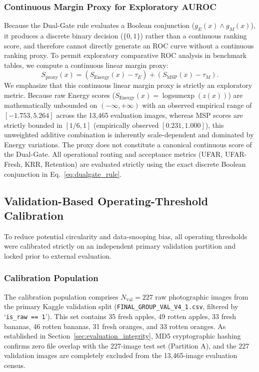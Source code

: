 \subsubsection{Continuous Margin Proxy for Exploratory AUROC}
\label{sec:continuous_proxy}
Because the Dual-Gate rule evaluates a Boolean conjunction ($g_E(x) \land g_M(x)$), it produces a discrete binary decision ($\{0, 1\}$) rather than a continuous ranking score, and therefore cannot directly generate an ROC curve without a continuous ranking proxy. To permit exploratory comparative ROC analysis in benchmark tables, we compute a continuous linear margin proxy:
\begin{equation}
S_{\text{proxy}}(x) = (S_{\text{Energy}}(x) - \tau_E) + (S_{\text{MSP}}(x) - \tau_M).
\end{equation}
We emphasize that this continuous linear margin proxy is strictly an exploratory metric. Because raw Energy scores ($S_{\text{Energy}}(x) = \operatorname{logsumexp}(z(x))$) are mathematically unbounded on $(-\infty, +\infty)$ with an observed empirical range of $[-1.753, 5.264]$ across the 13,465 evaluation images, whereas MSP scores are strictly bounded in $[1/6, 1]$ (empirically observed $[0.231, 1.000]$), this unweighted additive combination is inherently scale-dependent and dominated by Energy variations. The proxy does not constitute a canonical continuous score of the Dual-Gate. All operational routing and acceptance metrics (UFAR, UFAR-Fresh, KRR, Retention) are evaluated strictly using the exact discrete Boolean conjunction in Eq.~\eqref{eq:dualgate_rule}.

\subsection{Validation-Based Operating-Threshold Calibration}
\label{sec:threshold_calibration}

To reduce potential circularity and data-snooping bias, all operating thresholds were calibrated strictly on an independent primary validation partition and locked prior to external evaluation.

\subsubsection{Calibration Population}
The calibration population comprises $N_{\text{val}} = 227$ raw photographic images from the primary Kaggle validation split ({\small\nolinkurl{FINAL_GROUP_VAL_V4_1.csv}}, filtered by `\texttt{is\_raw == 1}'). This set contains 35 fresh apples, 49 rotten apples, 33 fresh bananas, 46 rotten bananas, 31 fresh oranges, and 33 rotten oranges. As established in Section~\ref{sec:evaluation_integrity}, MD5 cryptographic hashing confirms zero file overlap with the 227-image test set (Partition A), and the 227 validation images are completely excluded from the 13,465-image evaluation census.

